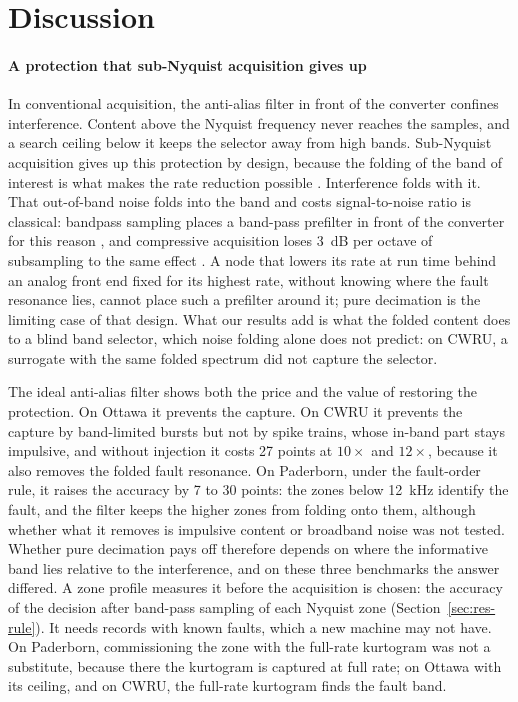 \section{Discussion}
\label{sec:discussion}

\paragraph{A protection that sub-Nyquist acquisition gives up}
In conventional acquisition, the anti-alias filter in front of the converter confines
interference. Content above the Nyquist frequency never reaches the samples, and a search ceiling
below it keeps the selector away from high bands. Sub-Nyquist acquisition gives up this protection
by design, because the folding of the band of interest is what makes the rate reduction possible
\citep{vaughan1991,mishali2010practice}. Interference folds with it. That out-of-band noise folds
into the band and costs signal-to-noise ratio is classical: bandpass sampling places a band-pass
prefilter in front of the converter for this reason \citep{vaughan1991}, and compressive
acquisition loses 3~dB per octave of subsampling to the same effect
\citep{davenport2012noisefolding}. A node that lowers its rate at run time behind an analog front
end fixed for its highest rate, without knowing where the fault resonance lies, cannot place such
a prefilter around it; pure decimation is the limiting case of that design. What our results add
is what the folded content does to a blind band selector, which noise folding alone does not
predict: on CWRU, a surrogate with the same folded spectrum did not capture the selector.

The ideal anti-alias filter shows both the price and the value of restoring the protection. On
Ottawa it prevents the capture. On CWRU it prevents the capture by band-limited bursts but not by
spike trains, whose in-band part stays impulsive, and without injection it costs 27 points at
$10\times$ and $12\times$, because it also removes the folded fault resonance. On Paderborn, under
the fault-order rule, it raises the accuracy by 7 to 30 points: the zones below 12~kHz identify the
fault, and the filter keeps the higher zones from folding onto them, although whether what it
removes is impulsive content or broadband noise was not tested. Whether pure decimation pays off
therefore depends on where the informative band lies relative to the interference, and on these
three benchmarks the answer differed. A zone profile measures it before the acquisition is chosen:
the accuracy of the decision after band-pass sampling of each Nyquist zone
(Section~\ref{sec:res-rule}). It needs records with known faults, which a new machine may not have.
On Paderborn, commissioning the zone with the full-rate kurtogram was not a substitute, because
there the kurtogram is captured at full rate; on Ottawa with its ceiling, and on CWRU, the full-rate
kurtogram finds the fault band.

